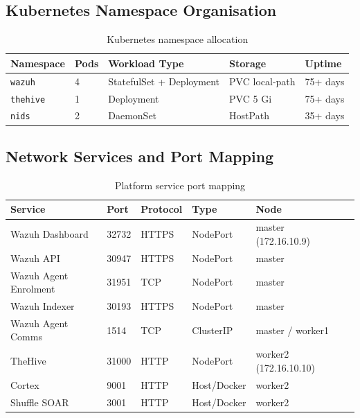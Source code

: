 \documentclass[12pt,a4paper]{report}
\begin{document}
\subsection{Kubernetes Namespace Organisation}

\begin{table}[H]
\centering
\caption{Kubernetes namespace allocation}
\begin{tabular}{lllll}
\toprule
\textbf{Namespace} & \textbf{Pods} & \textbf{Workload Type} & \textbf{Storage} & \textbf{Uptime} \\
\midrule
\texttt{wazuh}   & 4 & StatefulSet + Deployment & PVC local-path & 75+ days \\
\texttt{thehive} & 1 & Deployment               & PVC 5 Gi       & 75+ days \\
\texttt{nids}    & 2 & DaemonSet                & HostPath       & 35+ days \\
\bottomrule
\end{tabular}
\label{tab:namespaces}
\end{table}

\subsection{Network Services and Port Mapping}

\begin{table}[H]
\centering
\caption{Platform service port mapping}
\begin{tabular}{llllll}
\toprule
\textbf{Service} & \textbf{Port} & \textbf{Protocol} & \textbf{Type} & \textbf{Node} \\
\midrule
Wazuh Dashboard       & 32732 & HTTPS & NodePort    & master (172.16.10.9) \\
Wazuh API             & 30947 & HTTPS & NodePort    & master \\
Wazuh Agent Enrolment & 31951 & TCP   & NodePort    & master \\
Wazuh Indexer         & 30193 & HTTPS & NodePort    & master \\
Wazuh Agent Comms     & 1514  & TCP   & ClusterIP   & master / worker1 \\
TheHive               & 31000 & HTTP  & NodePort    & worker2 (172.16.10.10) \\
Cortex                & 9001  & HTTP  & Host/Docker & worker2 \\
Shuffle SOAR          & 3001  & HTTP  & Host/Docker & worker2 \\
\bottomrule
\end{tabular}
\label{tab:ports}
\end{table}
\end{document}
